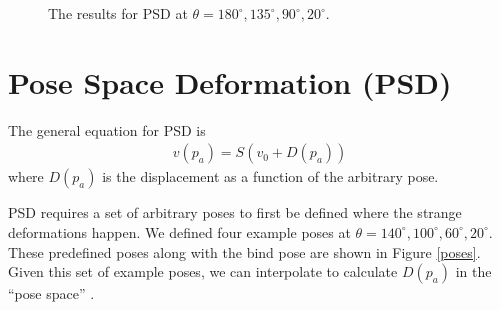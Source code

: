 \documentclass[11pt,twocolumn,letterpaper]{article}
\begin{document}
\begin{figure}
\begin{center}
\end{center}
   \caption{The results for PSD at $\theta = 180^{\circ}, 135^{\circ}, 90^{\circ}, 20^{\circ}$.}
\label{fig:short}
\label{psd_r}
\end{figure}

\section{Pose Space Deformation (PSD)}

The general equation for PSD is
\begin{align} v(p_a) = S(v_0 + D(p_a)) \end{align}
where $D(p_a)$ is the displacement as a function of the arbitrary pose.

PSD requires a set of arbitrary poses to first be defined where the strange deformations happen. We defined four example poses at $\theta = 140^{\circ}, 100^{\circ}, 60^{\circ}, 20^{\circ}$. These predefined poses along with the bind pose are shown in Figure \ref{poses}. Given this set of example poses, we can interpolate to calculate $D(p_a)$ in the ``pose space'' \cite{lewis2000pose}. 
\end{document}
